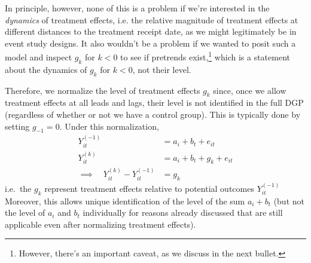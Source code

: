 \documentclass[12pt]{article}
\theoremstyle{plain}
\theoremstyle{definition}
\theoremstyle{remark}
\begin{document}
\begin{itemize}
    In principle, however, none of this is a problem if we're interested
    in the \emph{dynamics} of treatment effects, i.e. the relative
    magnitude of treatment effects at different distances to the
    treatment receipt date, as we might legitimately be in event study
    designs.
    It also wouldn't be a problem if we wanted to posit such a model and
    inspect $g_k$ for $k<0$ to see if pretrends exist,\footnote{%
      However, there's an important caveat, as we discuss in the next
      bullet.
    }
    which is a statement about the dynamics of $g_k$ for $k<0$, not
    their level.

    Therefore, we normalize the level of treatment effects $g_k$
    since, once we allow treatment effects at all leads and lags,
    their level is not identified in the full DGP
    (regardless of whether or not we have a control group).
    This is typically done by setting $g_{-1}=0$.
    Under this normalization,
    \begin{align*}
      Y_{it}^{(-1)}
      &= a_i + b_t + e_{it}
      \\
      Y_{it}^{(k)}
      &= a_i + b_t + g_k + e_{it}
      \\
      \implies\quad
      Y_{it}^{(k)}
      -
      Y_{it}^{(-1)}
      &=
      g_k
    \end{align*}
    i.e.\ the $g_k$ represent treatment effects relative to potential
    outcomes $Y_{it}^{(-1)}$
    Moreover, this allows unique identification of the level of the sum
    $a_i+b_t$ (but not the level of $a_i$ and $b_t$ individually for
    reasons already discussed that are still applicable even after
    normalizing treatment effects).


\end{itemize}
\end{document}
